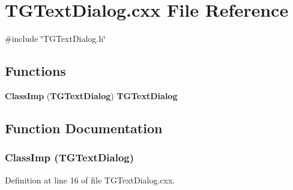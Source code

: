 \section{TGTextDialog.cxx File Reference}
\label{TGTextDialog_8cxx}
{\ttfamily \#include \char`\"{}TGTextDialog.h\char`\"{}}\par
\subsection*{Functions}
\begin{DoxyCompactItemize}
\item 
{\bf ClassImp} ({\bf TGTextDialog}) {\bf TGTextDialog}
\end{DoxyCompactItemize}


\subsection{Function Documentation}
\subsubsection[{ClassImp}]{\setlength{\rightskip}{0pt plus 5cm}ClassImp ({\bf TGTextDialog})}\label{TGTextDialog_8cxx_a4a410f26dc16617ca55abd91bab197ef}


Definition at line 16 of file TGTextDialog.cxx.